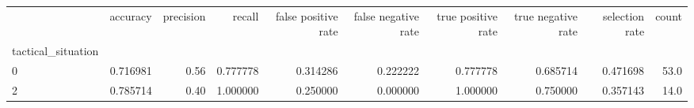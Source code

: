 \begin{tabular}{lrrrrrrrrr}
\toprule
{} &  accuracy &  precision &    recall &  false positive rate &  false negative rate &  true positive rate &  true negative rate &  selection rate &  count \\
tactical\_situation &           &            &           &                      &                      &                     &                     &                 &        \\
\midrule
0                  &  0.716981 &       0.56 &  0.777778 &             0.314286 &             0.222222 &            0.777778 &            0.685714 &        0.471698 &   53.0 \\
2                  &  0.785714 &       0.40 &  1.000000 &             0.250000 &             0.000000 &            1.000000 &            0.750000 &        0.357143 &   14.0 \\
\bottomrule
\end{tabular}
